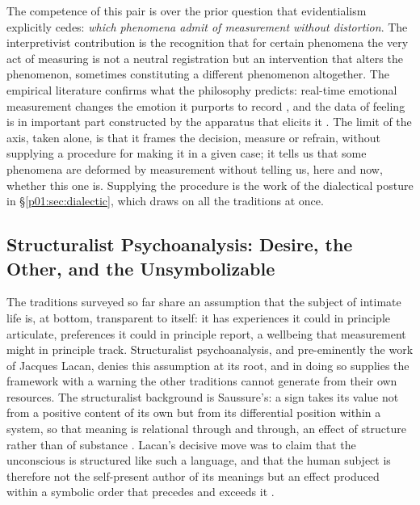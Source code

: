 The competence of this pair is over the prior question that evidentialism explicitly cedes: \emph{which phenomena admit of measurement without distortion}. The interpretivist contribution is the recognition that for certain phenomena the very act of measuring is not a neutral registration but an intervention that alters the phenomenon, sometimes constituting a different phenomenon altogether. The empirical literature confirms what the philosophy predicts: real-time emotional measurement changes the emotion it purports to record \parencite{howell2018emotional}, and the data of feeling is in important part constructed by the apparatus that elicits it \parencite{boehner2007how}. The limit of the axis, taken alone, is that it frames the decision, measure or refrain, without supplying a procedure for making it in a given case; it tells us that some phenomena are deformed by measurement without telling us, here and now, whether this one is. Supplying the procedure is the work of the dialectical posture in §\ref{p01:sec:dialectic}, which draws on all the traditions at once.

\subsection{Structuralist Psychoanalysis: Desire, the Other, and the Unsymbolizable}\label{p01:sec:lacan}

The traditions surveyed so far share an assumption that the subject of intimate life is, at bottom, transparent to itself: it has experiences it could in principle articulate, preferences it could in principle report, a wellbeing that measurement might in principle track. Structuralist psychoanalysis, and pre-eminently the work of Jacques Lacan, denies this assumption at its root, and in doing so supplies the framework with a warning the other traditions cannot generate from their own resources. The structuralist background is Saussure's: a sign takes its value not from a positive content of its own but from its differential position within a system, so that meaning is relational through and through, an effect of structure rather than of substance \parencite{saussure1916course}. Lacan's decisive move was to claim that the unconscious is structured like such a language, and that the human subject is therefore not the self-present author of its meanings but an effect produced within a symbolic order that precedes and exceeds it \parencite{lacan2006ecrits}.

